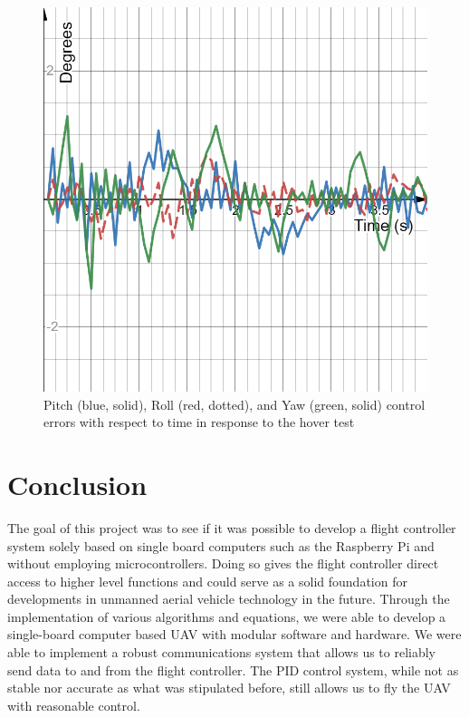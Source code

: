 \documentclass[english]{upeeei}
\begin{document}
\begin{figure}[h]
    \centering
    \includegraphics[scale=0.3]{images/pid_plot.png}
    \caption{Pitch (blue, solid), Roll (red, dotted), and Yaw (green, solid) control errors with respect to time in response to the hover test}
    \label{fig:pid_plot}
\end{figure}

\chapter{Conclusion}
The goal of this project was to see if it was possible to develop a flight controller system solely based on single board computers such as the
Raspberry Pi and without employing microcontrollers. Doing so gives the flight controller direct access to higher level functions and could serve
as a solid foundation for developments in unmanned aerial vehicle technology in the future. Through the implementation of various algorithms and
equations, we were able to develop a single-board computer based UAV with modular software and hardware. We were able to implement a robust communications
system that allows us to reliably send data to and from the flight controller. The PID control system, while not as stable nor accurate as what was
stipulated before, still allows us to fly the UAV with reasonable control.
\end{document}
